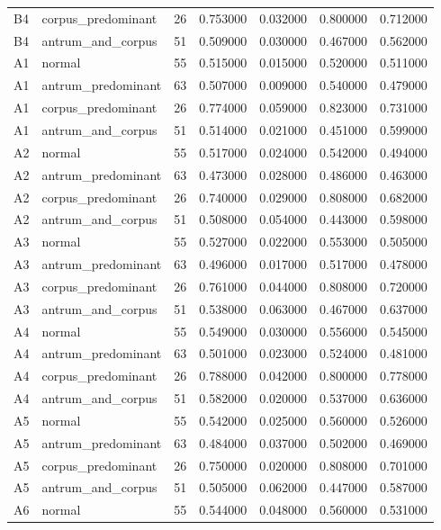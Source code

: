 \begin{table}
\begin{tabular}{llrrrrr}
B4 & corpus\_predominant & 26 & 0.753000 & 0.032000 & 0.800000 & 0.712000 \\
B4 & antrum\_and\_corpus & 51 & 0.509000 & 0.030000 & 0.467000 & 0.562000 \\
A1 & normal & 55 & 0.515000 & 0.015000 & 0.520000 & 0.511000 \\
A1 & antrum\_predominant & 63 & 0.507000 & 0.009000 & 0.540000 & 0.479000 \\
A1 & corpus\_predominant & 26 & 0.774000 & 0.059000 & 0.823000 & 0.731000 \\
A1 & antrum\_and\_corpus & 51 & 0.514000 & 0.021000 & 0.451000 & 0.599000 \\
A2 & normal & 55 & 0.517000 & 0.024000 & 0.542000 & 0.494000 \\
A2 & antrum\_predominant & 63 & 0.473000 & 0.028000 & 0.486000 & 0.463000 \\
A2 & corpus\_predominant & 26 & 0.740000 & 0.029000 & 0.808000 & 0.682000 \\
A2 & antrum\_and\_corpus & 51 & 0.508000 & 0.054000 & 0.443000 & 0.598000 \\
A3 & normal & 55 & 0.527000 & 0.022000 & 0.553000 & 0.505000 \\
A3 & antrum\_predominant & 63 & 0.496000 & 0.017000 & 0.517000 & 0.478000 \\
A3 & corpus\_predominant & 26 & 0.761000 & 0.044000 & 0.808000 & 0.720000 \\
A3 & antrum\_and\_corpus & 51 & 0.538000 & 0.063000 & 0.467000 & 0.637000 \\
A4 & normal & 55 & 0.549000 & 0.030000 & 0.556000 & 0.545000 \\
A4 & antrum\_predominant & 63 & 0.501000 & 0.023000 & 0.524000 & 0.481000 \\
A4 & corpus\_predominant & 26 & 0.788000 & 0.042000 & 0.800000 & 0.778000 \\
A4 & antrum\_and\_corpus & 51 & 0.582000 & 0.020000 & 0.537000 & 0.636000 \\
A5 & normal & 55 & 0.542000 & 0.025000 & 0.560000 & 0.526000 \\
A5 & antrum\_predominant & 63 & 0.484000 & 0.037000 & 0.502000 & 0.469000 \\
A5 & corpus\_predominant & 26 & 0.750000 & 0.020000 & 0.808000 & 0.701000 \\
A5 & antrum\_and\_corpus & 51 & 0.505000 & 0.062000 & 0.447000 & 0.587000 \\
A6 & normal & 55 & 0.544000 & 0.048000 & 0.560000 & 0.531000 \\

\end{tabular}
\end{table}
